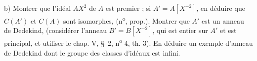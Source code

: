 b) Montrer que l'idéal $AX^2$ de $A$ est premier ; si $A'=A[X^{-2}]$, en déduire que $C(A')$ et $C(A)$ sont isomorphes, (n\textsuperscript{o}\quad, prop.\quad). Montrer que $A'$ est un anneau de Dedekind, (considérer l'anneau $B'=B[X^{-2}]$, qui est entier sur $A'$ et est principal, et utiliser le chap. V, \S\ 2, n\textsuperscript{o} 4, th. 3). En déduire un exemple d'anneau de Dedekind dont le groupe des classes d'idéaux est infini.


